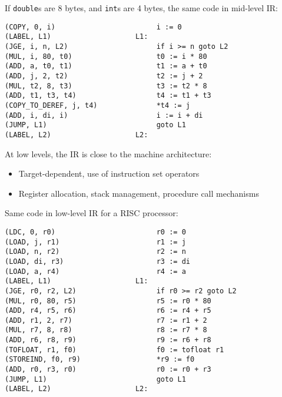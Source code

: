 \documentclass[../index.tex]{subfiles}
\begin{document}
\begin{frame}[fragile]{\currenttitle}
  If \texttt{double}s are 8 bytes, and \texttt{int}s are 4 bytes, the same code
  in mid-level IR: \\[1.5em]

  \begin{lstlisting}[xleftmargin=0.5cm]
(COPY, 0, i)                        i := 0
(LABEL, L1)                    L1:
(JGE, i, n, L2)                     if i >= n goto L2
(MUL, i, 80, t0)                    t0 := i * 80
(ADD, a, t0, t1)                    t1 := a + t0
(ADD, j, 2, t2)                     t2 := j + 2
(MUL, t2, 8, t3)                    t3 := t2 * 8
(ADD, t1, t3, t4)                   t4 := t1 + t3
(COPY_TO_DEREF, j, t4)              *t4 := j
(ADD, i, di, i)                     i := i + di
(JUMP, L1)                          goto L1
(LABEL, L2)                    L2:
  \end{lstlisting}

\end{frame}
  
\begin{frame}[fragile]{\currenttitle}
  At low levels, the IR is close to the machine architecture:

  \begin{itemize}
    \item Target-dependent, use of instruction set operators
    \item Register allocation, stack management, procedure call mechanisms
  \end{itemize}
\end{frame}
  
\begin{frame}[fragile]{\currenttitle}
  Same code in low-level IR for a RISC processor: \\[1em]

  \begin{lstlisting}[basicstyle=\ttfamily\scriptsize]
(LDC, 0, r0)                        r0 := 0
(LOAD, j, r1)                       r1 := j
(LOAD, n, r2)                       r2 := n
(LOAD, di, r3)                      r3 := di
(LOAD, a, r4)                       r4 := a
(LABEL, L1)                    L1:
(JGE, r0, r2, L2)                   if r0 >= r2 goto L2
(MUL, r0, 80, r5)                   r5 := r0 * 80
(ADD, r4, r5, r6)                   r6 := r4 + r5
(ADD, r1, 2, r7)                    r7 := r1 + 2
(MUL, r7, 8, r8)                    r8 := r7 * 8
(ADD, r6, r8, r9)                   r9 := r6 + r8
(TOFLOAT, r1, f0)                   f0 := tofloat r1
(STOREIND, f0, r9)                  *r9 := f0
(ADD, r0, r3, r0)                   r0 := r0 + r3
(JUMP, L1)                          goto L1
(LABEL, L2)                    L2:
  \end{lstlisting}
\end{frame}
  
\end{document}
